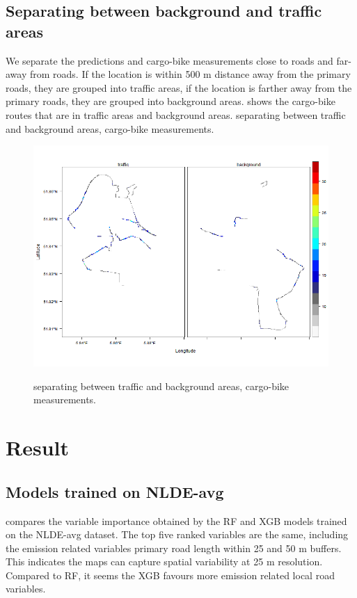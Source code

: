 \documentclass{article}
\begin{document}
\subsection{Separating between background and traffic areas}
We separate the predictions and cargo-bike measurements close to roads and far-away from roads. If the location is within 500 m distance away from the primary roads, they are grouped into traffic areas, if the location is farther away from the primary roads, they are grouped into background areas.  shows the cargo-bike routes that are in traffic areas and background areas. 
separating between traffic and background areas, cargo-bike measurements.
\begin{figure}[H]
    \includegraphics[width=\linewidth]{f2.png}
    \label{seperate}
    \caption {separating between traffic and background areas, cargo-bike measurements.}
\end{figure}


\section{Result}
\subsection{Models trained on NLDE-avg}
 compares the variable importance obtained by the RF and XGB models trained on the NLDE-avg dataset. The top five ranked variables are the same, including the emission related variables primary road length within 25 and 50 m buffers. This indicates the maps can capture spatial variability at 25 m resolution. Compared to RF, it seems the XGB favours more emission related local road variables. 
\end{document}

